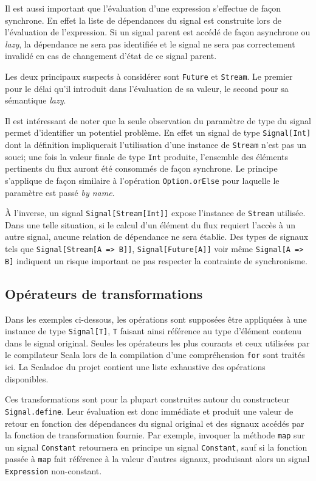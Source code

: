 Il est aussi important que l'évaluation d'une expression s'effectue de façon synchrone. En effet la liste de dépendances du signal est construite lors de l'évaluation de l'expression. Si un signal parent est accédé de façon asynchrone ou \emph{lazy}, la dépendance ne sera pas identifiée et le signal ne sera pas correctement invalidé en cas de changement d'état de ce signal parent.

Les deux principaux suspects à considérer sont \texttt{Future} et \texttt{Stream}. Le premier pour le délai qu'il introduit dans l'évaluation de sa valeur, le second pour sa sémantique \emph{lazy}.

Il est intéressant de noter que la seule observation du paramètre de type du signal permet d'identifier un potentiel problème. En effet un signal de type \texttt{Signal[Int]} dont la définition impliquerait l'utilisation d'une instance de \texttt{Stream} n'est pas un souci; une fois la valeur finale de type \texttt{Int} produite, l'ensemble des éléments pertinents du flux auront été consommés de façon synchrone. Le principe s'applique de façon similaire à l'opération \texttt{Option.orElse} pour laquelle le paramètre est passé \emph{by name}.

À l'inverse, un signal \texttt{Signal[Stream[Int]]} expose l'instance de \texttt{Stream} utilisée. Dans une telle situation, si le calcul d'un élément du flux requiert l'accès à un autre signal, aucune relation de dépendance ne sera établie. Des types de signaux tels que \texttt{Signal[Stream[A => B]]}, \texttt{Signal[Future[A]]} voir même \texttt{Signal[A => B]} indiquent un risque important ne pas respecter la contrainte de synchronisme.

\subsection{Opérateurs de transformations}
Dans les exemples ci-dessous, les opérations sont supposées être appliquées à une instance de type \texttt{Signal[T]}, \texttt{T} faisant ainsi référence au type d'élément contenu dans le signal original. Seules les opérateurs les plus courants et ceux utilisées par le compilateur Scala lors de la compilation d'une compréhension \texttt{for} sont traités ici. La Scaladoc du projet contient une liste exhaustive des opérations disponibles.

Ces transformations sont pour la plupart construites autour du constructeur \texttt{Signal.define}. Leur évaluation est donc immédiate et produit une valeur de retour en fonction des dépendances du signal original et des signaux accédés par la fonction de transformation fournie. Par exemple, invoquer la méthode \texttt{map} sur un signal \texttt{Constant} retournera en principe un signal \texttt{Constant}, sauf si la fonction passée à \texttt{map} fait référence à la valeur d'autres signaux, produisant alors un signal \texttt{Expression} non-constant.

